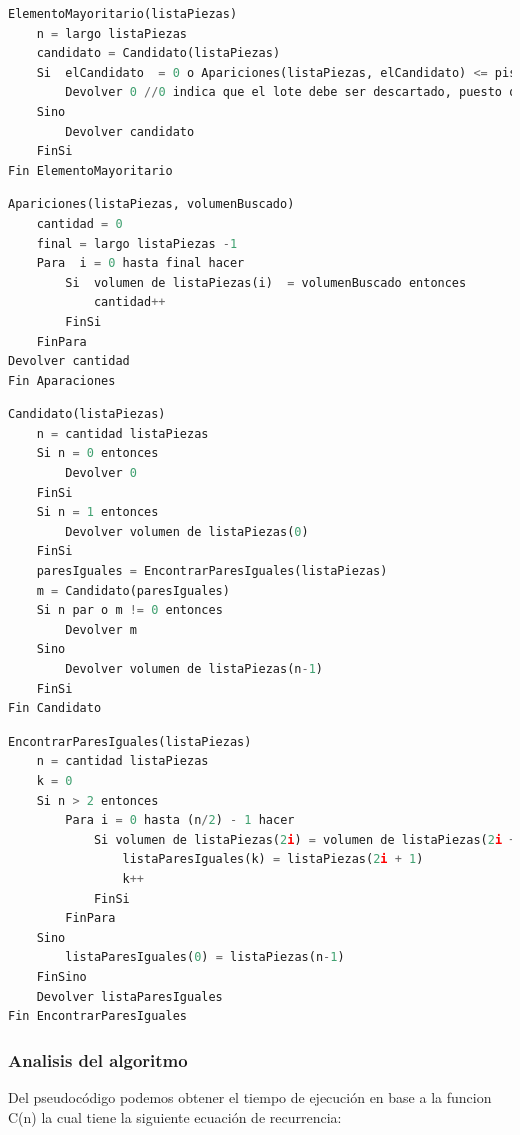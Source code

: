 \documentclass{article}
\begin{document}
\begin{lstlisting}[language=Python, caption=Algoritmo del proceso C - Elemento Mayoritario]
ElementoMayoritario(listaPiezas) 
    n = largo listaPiezas
    candidato = Candidato(listaPiezas)
    Si  elCandidato  = 0 o Apariciones(listaPiezas, elCandidato) <= piso(n/2) entonces 
        Devolver 0 //0 indica que el lote debe ser descartado, puesto que no hay elemento mayoritario
    Sino
        Devolver candidato
    FinSi
Fin ElementoMayoritario
\end{lstlisting}
\begin{lstlisting}[language=Python, caption=Algoritmo del proceso C - Apariciones]
Apariciones(listaPiezas, volumenBuscado)
    cantidad = 0
    final = largo listaPiezas -1
    Para  i = 0 hasta final hacer
        Si  volumen de listaPiezas(i)  = volumenBuscado entonces
            cantidad++
        FinSi
    FinPara
Devolver cantidad
Fin Aparaciones
\end{lstlisting}
\begin{lstlisting}[language=Python, caption=Algoritmo del proceso C - Candidato]
Candidato(listaPiezas)
    n = cantidad listaPiezas
    Si n = 0 entonces
        Devolver 0
    FinSi
    Si n = 1 entonces
        Devolver volumen de listaPiezas(0)
    FinSi
    paresIguales = EncontrarParesIguales(listaPiezas)
    m = Candidato(paresIguales)
    Si n par o m != 0 entonces
        Devolver m
    Sino
        Devolver volumen de listaPiezas(n-1)
    FinSi
Fin Candidato
\end{lstlisting}
\begin{lstlisting}[language=Python, caption=Algoritmo del proceso C - Encontrar Pares Iguales]
EncontrarParesIguales(listaPiezas)
    n = cantidad listaPiezas
    k = 0
    Si n > 2 entonces
        Para i = 0 hasta (n/2) - 1 hacer
            Si volumen de listaPiezas(2i) = volumen de listaPiezas(2i + 1) entonces
                listaParesIguales(k) = listaPiezas(2i + 1)
                k++
            FinSi
        FinPara
    Sino
        listaParesIguales(0) = listaPiezas(n-1)
    FinSino
    Devolver listaParesIguales
Fin EncontrarParesIguales
\end{lstlisting}

\subsubsection{Analisis del algoritmo}

Del pseudocódigo podemos obtener el tiempo de ejecución en base a la funcion C(n) la cual tiene la siguiente ecuación de recurrencia:
\end{document}
